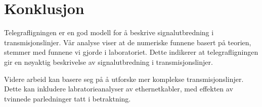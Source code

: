 \section{Konklusjon}
Telegrafligningen er en god modell for å beskrive signalutbredning i transmisjonslinjer. Vår analyse viser at de numeriske funnene basert på teorien, stemmer med funnene vi gjorde i laboratoriet. Dette indikerer at telegrafligningen gir en nøyaktig beskrivelse av signalutbredning i transmisjonslinjer.

Videre arbeid kan basere seg på å utforske mer komplekse transmisjonslinjer. Dette kan inkludere labratorieanalyser av ethernetkabler, med effekten av tvinnede parledninger tatt i betraktning.